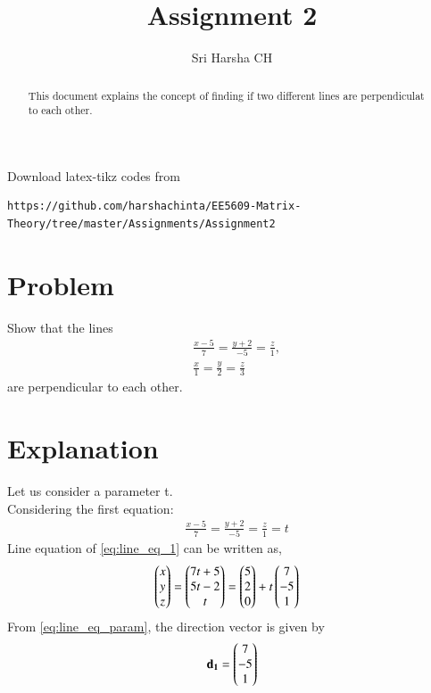 \documentclass[journal,12pt,twocolumn]{IEEEtran}
\begin{document}
\renewcommand{\thefigure}{\theproblem}

\def\putbox#1#2#3{\makebox[0in][l]{\makebox[#1][l]{}\raisebox{\baselineskip}[0in][0in]{\raisebox{#2}[0in][0in]{#3}}}}
     \def\rightbox#1{\makebox[0in][r]{#1}}
     \def\centbox#1{\makebox[0in]{#1}}
     \def\topbox#1{\raisebox{-\baselineskip}[0in][0in]{#1}}
     \def\midbox#1{\raisebox{-0.5\baselineskip}[0in][0in]{#1}}
\vspace{3cm}
\title{Assignment 2}
\author{Sri Harsha CH}

\maketitle
\newpage

\bigskip
\renewcommand{\thefigure}{\theenumi}
\renewcommand{\thetable}{\theenumi}

\begin{abstract}
This document explains the concept of finding if two different lines are perpendiculat to each other.
\end{abstract}


Download latex-tikz codes from 
%
\begin{lstlisting}
https://github.com/harshachinta/EE5609-Matrix-Theory/tree/master/Assignments/Assignment2
\end{lstlisting}
%
\section{Problem}
Show that the lines \\
 \begin{align}
& \frac{x-5}{7} = \frac{y+2}{-5} = \frac{z}{1} ,\\
& \frac{x}{1} = \frac{y}{2} = \frac{z}{3}
\end{align}
are perpendicular to each other.
\section{Explanation}
Let us consider a parameter t.\\ Considering the first equation:
 \begin{align}  \label{eq:line_eq_1}
& \frac{x-5}{7} = \frac{y+2}{-5} = \frac{z}{1} = t
\end{align}
Line equation of \ref{eq:line_eq_1} can be written as,
 \begin{align} \label{eq:line_eq_param}
& \begin{pmatrix}x\\ y\\ z\end{pmatrix} = \begin{pmatrix}7t+5\\ 5t-2\\ t\end{pmatrix} = \begin{pmatrix}5\\ 2\\ 0\end{pmatrix} +t \begin{pmatrix}7\\ -5\\ 1\end{pmatrix}
\end{align}
From \ref{eq:line_eq_param}, the direction vector is given by 
 \begin{align} \label{eq:dir_vec_1}
\mathbf{d_1} = \begin{pmatrix}7\\ -5\\ 1\end{pmatrix}
 \end{align}
\end{document}
